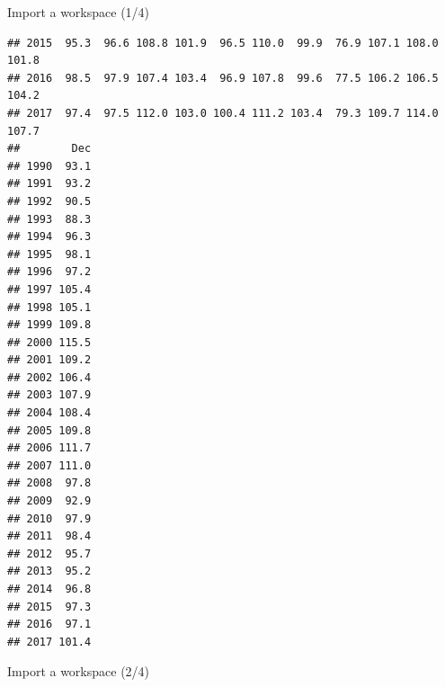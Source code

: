 \documentclass[10pt,xcolor=table,color={dvipsnames,usenames},ignorenonframetext,usepdftitle=false,french]{beamer}
\begin{document}
\begin{frame}[fragile]{Import a workspace (1/4)}
\begin{verbatim}
## 2015  95.3  96.6 108.8 101.9  96.5 110.0  99.9  76.9 107.1 108.0 101.8
## 2016  98.5  97.9 107.4 103.4  96.9 107.8  99.6  77.5 106.2 106.5 104.2
## 2017  97.4  97.5 112.0 103.0 100.4 111.2 103.4  79.3 109.7 114.0 107.7
##        Dec
## 1990  93.1
## 1991  93.2
## 1992  90.5
## 1993  88.3
## 1994  96.3
## 1995  98.1
## 1996  97.2
## 1997 105.4
## 1998 105.1
## 1999 109.8
## 2000 115.5
## 2001 109.2
## 2002 106.4
## 2003 107.9
## 2004 108.4
## 2005 109.8
## 2006 111.7
## 2007 111.0
## 2008  97.8
## 2009  92.9
## 2010  97.9
## 2011  98.4
## 2012  95.7
## 2013  95.2
## 2014  96.8
## 2015  97.3
## 2016  97.1
## 2017 101.4
\end{verbatim}

\end{frame}

\begin{frame}{Import a workspace (2/4)}
\protect\hypertarget{import-a-workspace-24}{}


\end{frame}
\end{document}
